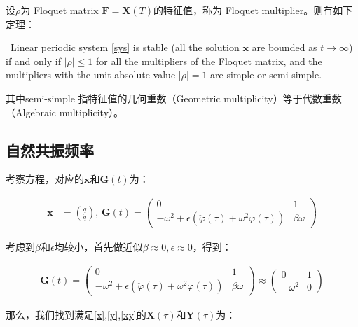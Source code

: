 设$\rho$为 Floquet matrix $\mathbf{F}=\mathbf{X}(T)$的特征值，称为 Floquet multiplier。则有如下定理：

\begin{theorem}
\label{Floquet}
\,\newline
Linear periodic system \eqref{sys} is stable (all the solution $\mathbf{x}$ are bounded as $t\rightarrow\infty$) if and only if $|\rho|\leq1$ for all the multipliers of the Floquet matrix, and the multipliers with the unit absolute value $|\rho|=1$ are simple or semi-simple. 
\end{theorem}

其中semi-simple 指特征值的几何重数（Geometric multiplicity）等于代数重数（Algebraic multiplicity）。

\subsection{自然共振频率}

考察方程，对应的$\mathbf{x}$和$\mathbf{G}(t)$为：

\begin{align}
    \mathbf{x} &= \binom{q}{\dot{q}}, \,
    \mathbf{G}(t) = 
    \begin{pmatrix}
        0 & 1 \\ 
        -\omega^{2}+\epsilon\left(\ddot{\varphi}(\tau)+\omega^{2}\varphi(\tau)\right) & \beta\omega
    \end{pmatrix}
\end{align}

考虑到$\beta$和$\epsilon$均较小，首先做近似$\beta\approx0,\epsilon\approx0$，得到：

\begin{align}
    \mathbf{G}(t) = 
    \begin{pmatrix}
        0 & 1 \\ 
        -\omega^{2}+\epsilon\left(\ddot{\varphi}(\tau)+\omega^{2}\varphi(\tau)\right) & \beta\omega
    \end{pmatrix}\approx
    \begin{pmatrix}
        0 & 1 \\ 
        -\omega^{2} & 0
    \end{pmatrix}
\end{align}

那么，我们找到满足\eqref{x},\eqref{y},\eqref{xy}的$\mathbf{X}(\tau)$和$\mathbf{Y}(\tau)$为：

